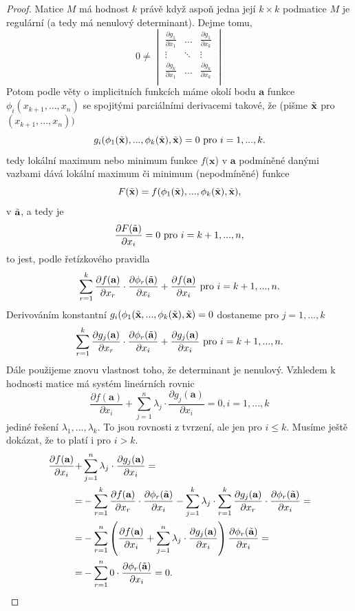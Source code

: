 \documentclass[../main.tex]{subfiles}
\begin{document}
\begin{proof}
	Matice $M$ má hodnost $k$ právě když aspoň jedna její $k\times k$ podmatice $M$ je regulární (a tedy má nenulový determinant). Dejme tomu,
	\[ 0 \neq \begin{vmatrix}
	\frac{\partial g_1}{\partial x_1} & \dots & \frac{\partial g_1}{\partial x_k}\\
	\vdots & \ddots & \vdots\\
	\frac{\partial g_k}{\partial x_1} & \dots & \frac{\partial g_k}{\partial x_k}\\
	\end{vmatrix}\]
	Potom podle věty o implicitních funkcích máme okolí bodu $\textbf{a}$ funkce $\phi_i(x_{k+1},...,x_n)$
	se spojitými parciálními derivacemi takové, že (pišme $\Tilde{\textbf{x}}$ pro $(x_{k+1},...,x_n))$
	\[g_i(\phi_1(\Tilde{\textbf{x}}),...,\phi_k(\Tilde{\textbf{x}}),\Tilde{\textbf{x}}) = 0 \text{ pro } i=1,...,k.\]
	tedy lokální maximum nebo minimum funkce $f(\textbf{x}$) v $\textbf{a}$ podmíněné danými vazbami dává lokální maximum či minimum (nepodmíněné) funkce
	\[F(\Tilde{\textbf{x}}) = f(\phi_1(\Tilde{\textbf{x}}),...,\phi_k(\Tilde{\textbf{x}}),\Tilde{\textbf{x}}),\]
	v $\Tilde{\textbf{a}}$, a tedy je 
	\[\frac{\partial F(\Tilde{\textbf{a}})}{\partial x_i} = 0 \text{ pro } i = k+1,...,n,\]
	to jest, podle řetízkového pravidla
	\[\sum^k_{r=1}\frac{\partial f(\textbf{a})}{\partial x_r}\cdot \frac{\partial \phi_r(\Tilde{\textbf{a}})}{\partial x_i} + \frac{\partial f(\textbf{a})}{\partial x_i} \text{ pro } i = k+1,...,n.\]
	Derivováním konstantní $g_i(\phi_1(\Tilde{\textbf{x}},...,\phi_k(\Tilde{\textbf{x}}),\Tilde{\textbf{x}}) = 0$ dostaneme pro $j = 1,...,k$
	\[\sum^k_{r=1}\frac{\partial g_j(\textbf{a})}{\partial x_r}\cdot \frac{\partial \phi_r(\Tilde{\textbf{a}})}{\partial x_i} + \frac{\partial g_j(\textbf{a})}{\partial x_i} \text{ pro } i = k+1,...,n.\]
	Dále použijeme znovu vlastnost toho, že determinant je nenulový. Vzhledem k hodnosti matice má systém lineárních rovnic
	\[\frac{\partial f(\textbf{a})}{\partial x_i} + \sum^n_{j=1}\lambda_j\cdot\frac{\partial g_j(\textbf{a})}{\partial x_i} = 0, i = 1,...,k\]
	jediné řešení $\lambda_1,...,\lambda_k.$ To jsou rovnosti z tvrzení, ale jen pro $i \leq k$. Musíme ještě dokázat, že to platí i pro $i > k$. 
	\begin{align*}
	\frac{\partial f(\textbf{a})}{\partial x_i} + & \sum^n_{j=1}\lambda_j\cdot\frac{\partial g_j(\textbf{a})}{\partial x_i}=\\
	= & - \sum^k_{r=1} \frac{\partial f(\textbf{a})}{\partial x_r}\cdot\frac{\partial \phi_r(\Tilde{\textbf{a}})}{\partial x_i} -
	\sum^k_{j=1}\lambda_j\cdot\sum^k_{r=1}\frac{\partial g_j(\textbf{a})}{\partial x_r}\cdot\frac{\partial \phi_r(\Tilde{\textbf{a}})}{\partial x_i} =\\
	= & - \sum^n_{r=1}\left(\frac{\partial f(\textbf{a})}{\partial x_i}+\sum^n_{j=1}\lambda_j\cdot\frac{\partial g_j(\textbf{a})}{\partial x_i}\right)\frac{\partial \phi_r(\Tilde{\textbf{a}})}{\partial x_i}=\\
	= & - \sum^n_{r=1}0\cdot\frac{\partial \phi_r(\Tilde{\textbf{a}})}{\partial x_i}=0.
	\end{align*}
\end{proof}
\end{document}
